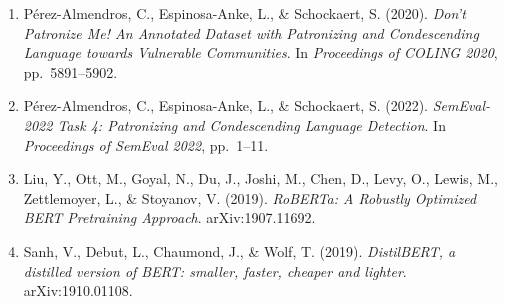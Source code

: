 \documentclass[11pt]{article}
\begin{document}
\begin{enumerate}
    \item Pérez-Almendros, C., Espinosa-Anke, L., \& Schockaert, S. (2020). \textit{Don't Patronize Me! An Annotated Dataset with Patronizing and Condescending Language towards Vulnerable Communities}. In \emph{Proceedings of COLING 2020}, pp.\ 5891--5902.

    \item Pérez-Almendros, C., Espinosa-Anke, L., \& Schockaert, S. (2022). \textit{SemEval-2022 Task 4: Patronizing and Condescending Language Detection}. In \emph{Proceedings of SemEval 2022}, pp.\ 1--11.

    \item Liu, Y., Ott, M., Goyal, N., Du, J., Joshi, M., Chen, D., Levy, O., Lewis, M., Zettlemoyer, L., \& Stoyanov, V. (2019). \textit{RoBERTa: A Robustly Optimized BERT Pretraining Approach}. arXiv:1907.11692.

    \item Sanh, V., Debut, L., Chaumond, J., \& Wolf, T. (2019). \textit{DistilBERT, a distilled version of BERT: smaller, faster, cheaper and lighter}. arXiv:1910.01108.
\end{enumerate}
\end{document}
